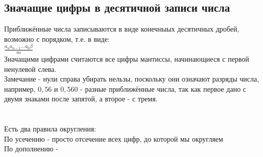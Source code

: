\documentclass[a4paper]{article}
\begin{document}
\subsection{Значащие цифры в десятичной записи числа}%
\setcounter{subsection}{4}
Приближённые числа записываются в виде конечныых десятичных дробей, возможно с порядком, т.е. в виде:\\
$\frac{a_n a_{n-1} \dots a_0 \beta }{m}$\\
Значащими цифрами считаются все цифры мантиссы, начинающиеся с первой ненулевой слева.\\
Замечание - нули справа убирать нельзы, поскольку они означают разряды числа, например, $0,56$ и $0,560$ - разные приближённые числа, так как первое дано с двумя знаками после запятой, а второе - с тремя.\\\\\\
Есть два правила округления:\\
По усечению - просто отсечение всех цифр, до которой мы округляем\\
По дополнению - \\
\end{document}
